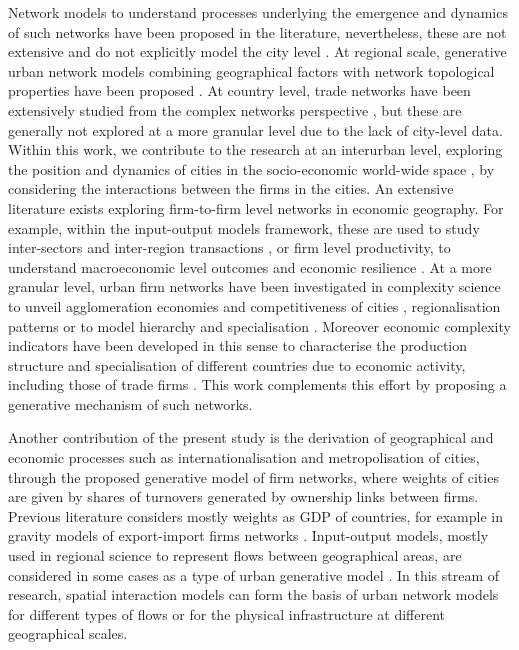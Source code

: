 \documentclass[10pt,letterpaper]{article}
\begin{document}
Network models to understand processes underlying the emergence and dynamics of such networks have been proposed in the literature, nevertheless, these are not extensive and do not explicitly model the city level \cite{taylor2001specification}. At regional scale, generative urban network models combining geographical factors with network topological properties have been proposed \cite{dai2016simulating}. At country level, trade networks have been extensively studied from the complex networks perspective \cite{garlaschelli2005structure}, but these are generally not explored at a more granular level due to the lack of city-level data. 
Within this work, we contribute to the research at an interurban level, exploring the position and dynamics of cities in the socio-economic world-wide space \cite{pumain2018evolutionary} \cite{berry1964cities}, by considering the interactions between the firms in the cities. 
An extensive literature exists exploring firm-to-firm level networks in economic geography. For example, within the input-output models framework, these are used to study inter-sectors and inter-region transactions \cite{Rodriguesetal2016}, or firm level productivity, to understand macroeconomic level outcomes \cite{Grassi2016} and economic resilience \cite{Ialongo2021}.
At a more granular level, urban firm networks have been investigated in complexity science \cite{RozenblatNeal2021} to unveil agglomeration economies and competitiveness of cities \cite{Rozenblat2010}, regionalisation patterns \cite{Rozenblatetal2017} or to model hierarchy and specialisation \cite{BidaRozenblat2020}. Moreover economic complexity indicators have been developed in this sense to characterise the production structure and specialisation of different countries due to economic activity, including those of trade firms \cite{HaussmanHidalgo2009,OCleary2016}. This work complements this effort by proposing a generative mechanism of such networks. 

Another contribution of the present study is the derivation of geographical and economic processes such as internationalisation and metropolisation of cities, through the proposed generative model of firm networks, where weights of cities are given by shares of turnovers generated by ownership links between firms. Previous literature considers mostly weights as GDP of countries, for example in gravity models of export-import firms networks \cite{Kepaptsogloual2010} \cite{MinondoRequena2013}. Input-output models, mostly used in regional science to represent flows between geographical areas, are considered in some cases as a type of urban generative model \cite{jin1993generation}. In this stream of research, spatial interaction models \cite{dennett2013multilevel} can form the basis of urban network models for different types of flows \cite{dai2016generative} or for the physical infrastructure \cite{raimbault2018indirect} at different geographical scales. 
\end{document}
